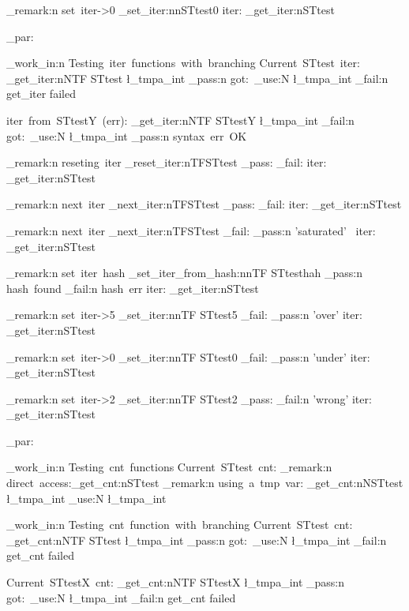\documentclass{article}
\begin{document}
\sttests_remark:n {set~iter->0} \starray_set_iter:nn{STtest}{0}
iter: \starray_get_iter:n{STtest}

\sttests_par:

\sttests_work_in:n {Testing~iter~functions~with~branching}
Current~STtest~iter: 
\starray_get_iter:nNTF {STtest} \l_tmpa_int 
  {\sttests_pass:n {got:~\int_use:N \l_tmpa_int}}
  {\sttests_fail:n {get_iter failed}}

iter~from~STtestY~(err): 
\starray_get_iter:nNTF {STtestY} \l_tmpa_int 
  {\sttests_fail:n {got:~\int_use:N \l_tmpa_int}}
  {\sttests_pass:n {syntax~err~OK}}

\sttests_remark:n {reseting~iter} 
\starray_reset_iter:nTF{STtest}
  {\sttests_pass:}
  {\sttests_fail:}
iter: \starray_get_iter:n{STtest}

\sttests_remark:n {next~iter} 
\starray_next_iter:nTF{STtest}
  {\sttests_pass:}
  {\sttests_fail:}
iter: \starray_get_iter:n{STtest}

\sttests_remark:n {next~iter} 
\starray_next_iter:nTF{STtest}
  {\sttests_fail:}
  {\sttests_pass:n {'saturated'}~}
iter: \starray_get_iter:n{STtest}

\sttests_remark:n {set~iter~hash} 
\starray_set_iter_from_hash:nnTF {STtest}{hah}
  {\sttests_pass:n {hash~found}}
  {\sttests_fail:n {hash~err}}
iter: \starray_get_iter:n{STtest}

\sttests_remark:n {set~iter->5} 
\starray_set_iter:nnTF {STtest}{5}
  {\sttests_fail:}
  {\sttests_pass:n {'over'}}
iter: \starray_get_iter:n{STtest}

\sttests_remark:n {set~iter->0} 
\starray_set_iter:nnTF {STtest}{0}
  {\sttests_fail:}
  {\sttests_pass:n {'under'}}
iter: \starray_get_iter:n{STtest}

\sttests_remark:n {set~iter->2} 
\starray_set_iter:nnTF {STtest}{2}
  {\sttests_pass:}
  {\sttests_fail:n {'wrong'}}
iter: \starray_get_iter:n{STtest}

\sttests_par:

\sttests_work_in:n {Testing~cnt~functions}
Current~STtest~cnt: 
\sttests_remark:n {direct~access:\starray_get_cnt:n{STtest}}
\sttests_remark:n {using~a~tmp~var: \starray_get_cnt:nN{STtest} \l_tmpa_int \int_use:N \l_tmpa_int}

\sttests_work_in:n {Testing~cnt~function~with~branching}
Current~STtest~cnt: 
\starray_get_cnt:nNTF {STtest} \l_tmpa_int 
  {\sttests_pass:n {got:~\int_use:N \l_tmpa_int}}
  {\sttests_fail:n {get_cnt failed}}

Current~STtestX~cnt: 
\starray_get_cnt:nNTF {STtestX} \l_tmpa_int 
  {\sttests_pass:n {got:~\int_use:N \l_tmpa_int}}
  {\sttests_fail:n {get_cnt failed}}
\end{document}

